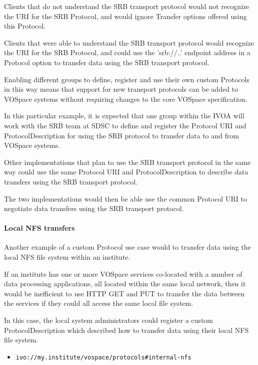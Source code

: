 \documentclass[11pt,a4paper]{ivoa}
\begin{document}
Clients that do not understand the SRB transport protocol would not recognize the URI for the SRB Protocol, and would ignore Transfer options offered using this Protocol.

Clients that were able to understand the SRB transport protocol would recognize the URI for the SRB Protocol, and could use the 'srb://..' endpoint address in a Protocol option to transfer data using the SRB transport protocol.

Enabling different groups to define, register and use their own custom Protocols in this way means that support for new transport protocols can be added to VOSpace systems without requiring changes to the core VOSpace specification.

In this particular example, it is expected that one group within the IVOA will work with the SRB team at SDSC to define and register the Protocol URI and ProtocolDescription for using the SRB protocol to transfer data to and from VOSpace systems.

Other implementations that plan to use the SRB transport protocol in the same way could use the same Protocol URI and ProtocolDescription to describe data transfers using the SRB transport protocol.

The two implementations would then be able use the common Protocol URI to negotiate data transfers using the SRB transport protocol.

\paragraph{Local NFS transfers}
Another example of a custom Protocol use case would to transfer data using the local NFS file system within an institute.

If an institute has one or more VOSpace services co-located with a number of data processing applications, all located within the same local network, then it would be inefficient to use HTTP GET and PUT to transfer the data between the services if they could all access the same local file system.

In this case, the local system administrators could register a custom ProtocolDescription which described how to transfer data using their local NFS file system.

\begin{itemize}
    \item \begin{verbatim}ivo://my.institute/vospace/protocols#internal-nfs\end{verbatim}
\end{itemize}
\end{document}
